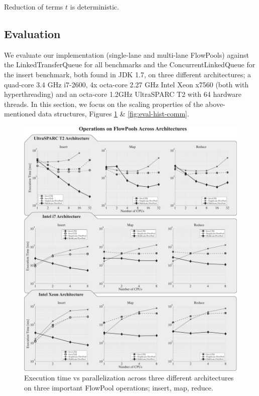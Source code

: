 \begin{theorem}
Reduction of terms $t$ is deterministic.
\end{theorem}


\subsection{Evaluation}
\label{sec:evaluation}

We evaluate our implementation (single-lane and multi-lane FlowPools) against
the LinkedTransferQueue \cite{SchererLS09} for all benchmarks and the
ConcurrentLinkedQueue \cite{Michael96} for the insert benchmark, both found in
JDK 1.7, on three different architectures; a quad-core 3.4 GHz i7-2600, 4x
octa-core 2.27 GHz Intel Xeon x7560 (both with hyperthreading) and an octa-core
1.2GHz UltraSPARC T2 with 64 hardware threads. In this section, we focus
on the scaling properties of the above-mentioned data structures, Figures
\ref{fig:eval-cpu-scaling} \& \ref{fig:eval-hist-comm}.

\begin{figure}[ht!]
\centering
\includegraphics[width=\textwidth]{images/scaling-operations}
\setlength{\abovecaptionskip}{-10pt}
\setlength{\belowcaptionskip}{-20pt}
\caption{Execution time vs parallelization across three different
architectures on three important FlowPool operations; insert, map,
reduce.}
\label{fig:eval-cpu-scaling}
\end{figure}

